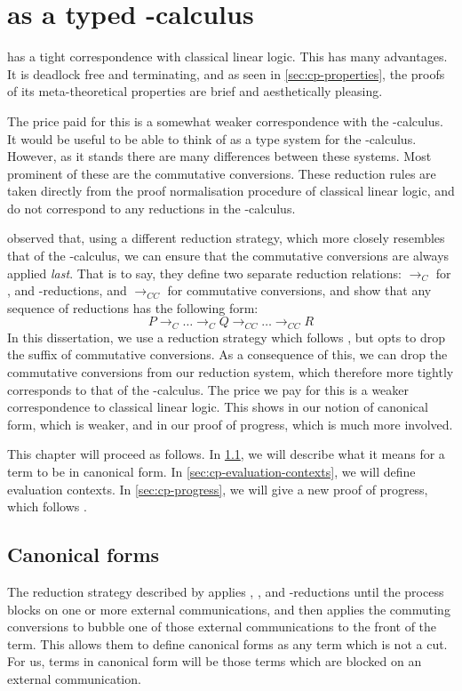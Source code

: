 \chapter{\cp as a typed \textpi-calculus}
\cp has a tight correspondence with classical linear logic.
This has many advantages.
It is deadlock free and terminating, and as seen in \cref{sec:cp-properties},
the proofs of its meta-theoretical properties are brief and aesthetically
pleasing.

The price paid for this is a somewhat weaker correspondence with the
\textpi-calculus.
It would be useful to be able to think of \cp as a type system for the
\textpi-calculus.
However, as it stands there are many differences between these systems.
Most prominent of these are the commutative conversions. These reduction rules
are taken directly from the proof normalisation procedure of classical linear
logic, and do not correspond to any reductions in the \textpi-calculus.

 observed that, using a different reduction
strategy, which more closely resembles that of the \textpi-calculus, we can
ensure that the commutative conversions are always applied \emph{last}.
That is to say, they define two separate reduction relations:
$\longrightarrow_{C}$ for ,  and \textbeta-reductions,
and $\longrightarrow_{CC}$ for commutative conversions, and show that any
sequence of reductions has the following form:
\[
  P \longrightarrow_{C} \dots \longrightarrow_{C} Q \longrightarrow_{CC} \dots \longrightarrow_{CC} R
\]
In this dissertation, we use a reduction strategy which follows
, but opts to drop the suffix of commutative
conversions.
As a consequence of this, we can drop the commutative conversions from our
reduction system, which therefore more tightly corresponds to that of the
\textpi-calculus. 
The price we pay for this is a weaker correspondence to classical linear logic.
This shows in our notion of canonical form, which is weaker, and in our proof of
progress, which is much more involved.

This chapter will proceed as follows.
In \cref{sec:cp-canonical-forms}, we will describe what it means for a term to
be in canonical form.
In \cref{sec:cp-evaluation-contexts}, we will define evaluation contexts.
In \cref{sec:cp-progress}, we will give a new proof of progress, which follows
.

\section{Canonical forms}\label{sec:cp-canonical-forms}
The reduction strategy described by \citeauthor{lindley2015semantics} applies
, , and \textbeta-reductions until the process blocks on
one or more external communications, and then applies the commuting conversions
to bubble one of those external communications to the front of the term.
This allows them to define canonical forms as any term which is not a cut.
For us, terms in canonical form will be those terms which are blocked on an
external communication.

